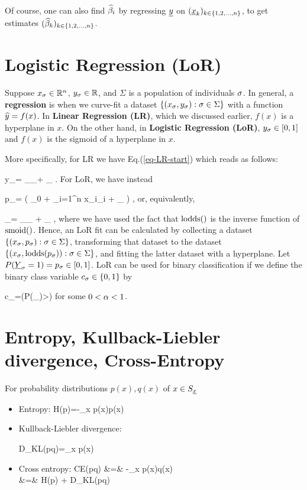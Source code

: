 Of course, one can also
find $\widehat{\beta}_i$
by regressing ${\underline{y}}$
on $({\underline{x}}_k)_{k\in \{1,2,
\ldots, n\}}$, to get
estimates
$(\widehat{\beta}_k)_{k\in \{1,2,
\ldots, n\}}$.

\section{Logistic Regression (LoR)}

Suppose
$x_\sigma\in { \mathbb{R}}^n$,
$y_\sigma\in { \mathbb{R}}$,
and $\Sigma$
is a population
of individuals $\sigma$.
In general,
a {\bf regression}
is when
we curve-fit a dataset
$\{(x_\sigma, y_\sigma):\sigma\in\Sigma\}$
with a function
${\widehat{y}}=f(x)$.
In {\bf Linear
Regression (LR)},
which we
discussed earlier,
$f(x)$ is a hyperplane
in $x$.
On the other hand,
in {\bf Logistic Regression (LoR)},
$y_\sigma\in[0,1]$ and
$f(x)$ is the sigmoid of
a hyperplane in $x$.



More specifically, for LR
we have
Eq.(\ref{eq-LR-start})
which reads as follows:

\beq
y_\s=
_{\haty_\s}+ \eps_\s
\quad{}\;.
\eeq
For LoR, we have instead

\beq
p_\s=
\smoid\left(
\beta_0 +
\sum_{i=1}^{n} x_{\s i}\beta_{i} + \eps_\s
\right)
\quad{}\;,
\eeq
or, equivalently,


\beq
{}
_{\ln {}}=
_{\haty_\s} + \eps_\s
\quad{}\;,
\eeq
where we have used the fact that
${\rm lodds}()$
is the inverse function of ${\rm smoid}()$.
Hence, an LoR
fit can be calculated by
collecting a dataset
$\{(x_\sigma, p_\sigma):\sigma\in\Sigma\}$,
transforming that
dataset to the dataset
$\{(x_\sigma,{\rm lodds}( p_\sigma)):\sigma\in\Sigma\}$,
and fitting the latter dataset
with a hyperplane.
Let $P({\underline{Y}}_\sigma=1)=p_\sigma\in [0,1]$.
LoR can be used
for binary
classification
if we define the
binary class
variable $c_\sigma\in \{0,1\}$ by

\beq
c_\s =\indi(P(\rvY_)>\alp)
\eeq
for some $0<\alpha<1$.



\section{Entropy,
 Kullback-Liebler divergence, Cross-Entropy}

For probability distributions $p(x), q(x)$ of $x\in S_{\underline{x}}$
\begin{itemize}
\item
Entropy:
\beq
H(p)=-\sum_x p(x)\ln p(x)
\eeq

\item
Kullback-Liebler divergence:

\beq
D_{KL}(p\parallel q)=\sum_{x} p(x)\ln {}
\eeq
\item
Cross entropy:
\beqa
CE(p\parallel q) &=& -\sum_x p(x)\ln q(x)\\
&=& H(p) + D_{KL}(p\parallel q)
\eeqa
\end{itemize}

